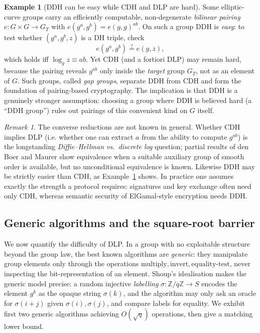 \documentclass[11pt,a4paper]{article}
\theoremstyle{definition}
\newtheorem{example}[theorem]{Example}
\theoremstyle{remark}
\newtheorem{remark}[theorem]{Remark}
\newcommand{\Z}{\ensuremath{\mathbb{Z}}}
\begin{document}
\begin{example}[DDH can be easy while CDH and DLP are hard]
\label{assumptions:exa:pairing}
Some elliptic-curve groups carry an efficiently computable, non-degenerate \emph{bilinear pairing} \(e \colon G \times G \to G_T\) with \(e(g^a, g^b) = e(g,g)^{ab}\). On such a group DDH is \emph{easy}: to test whether \((g^a, g^b, z)\) is a DH triple, check
\[
e(g^a, g^b) \stackrel{?}{=} e(g, z),
\]
which holds iff \(\log_g z \equiv ab\). Yet CDH (and a fortiori DLP) may remain hard, because the pairing reveals \(g^{ab}\) only inside the \emph{target} group \(G_T\), not as an element of \(G\). Such groups, called \emph{gap groups}, separate DDH from CDH and form the foundation of pairing-based cryptography. The implication is that DDH is a genuinely stronger assumption: choosing a group where DDH is believed hard (a ``DDH group'') rules out pairings of this convenient kind on \(G\) itself.
\end{example}

\begin{remark}
\label{assumptions:rem:converse}
The converse reductions are not known in general. Whether CDH implies DLP (i.e. whether one can extract \(a\) from the ability to compute \(g^{ab}\)) is the longstanding \emph{Diffie--Hellman vs.\ discrete log} question; partial results of den Boer and Maurer show equivalence when a suitable auxiliary group of smooth order is available, but no unconditional equivalence is known. Likewise DDH may be strictly easier than CDH, as Example~\ref{assumptions:exa:pairing} shows. In practice one assumes exactly the strength a protocol requires: signatures and key exchange often need only CDH, whereas semantic security of ElGamal-style encryption needs DDH.
\end{remark}
\subsection{Generic algorithms and the square-root barrier}
\label{assumptions:subsec:generic}

We now quantify the difficulty of DLP. In a group with no exploitable structure beyond the group law, the best known algorithms are \emph{generic}: they manipulate group elements only through the operations \(\text{multiply}, \text{invert}, \text{equality-test}\), never inspecting the bit-representation of an element. Shoup's idealisation makes the generic model precise: a random injective \emph{labelling} \(\sigma \colon \Z/q\Z \to S\) encodes the element \(g^k\) as the opaque string \(\sigma(k)\), and the algorithm may only ask an oracle for \(\sigma(i + j)\) given \(\sigma(i), \sigma(j)\), and compare labels for equality. We exhibit first two generic algorithms achieving \(O(\sqrt q)\) operations, then give a matching lower bound.
\end{document}
